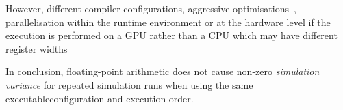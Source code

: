 
\DIFdelend %
However, different compiler configurations, aggressive optimisations~\cite{llvm-floating-point}, 
\DIFdelbegin {}\DIFdelend parallelisation within the runtime environment or at the hardware level \DIFdelbegin {}\DIFdelend \DIFaddbegin {}\DIFaddend if the execution is performed on a GPU rather than a CPU \DIFaddbegin \DIFadd{(}\DIFaddend which may have different register widths~\cite{Whitehead2011}\DIFdelbegin {}%

\DIFdelend \DIFaddbegin {}\DIFaddend In conclusion, floating-point arithmetic does not cause non-zero \textit{simulation variance} for repeated simulation runs when using the same executable\DIFdelbegin {}\DIFdelend \DIFaddbegin {}\DIFaddend configuration and execution order.



\DIFaddbegin 


